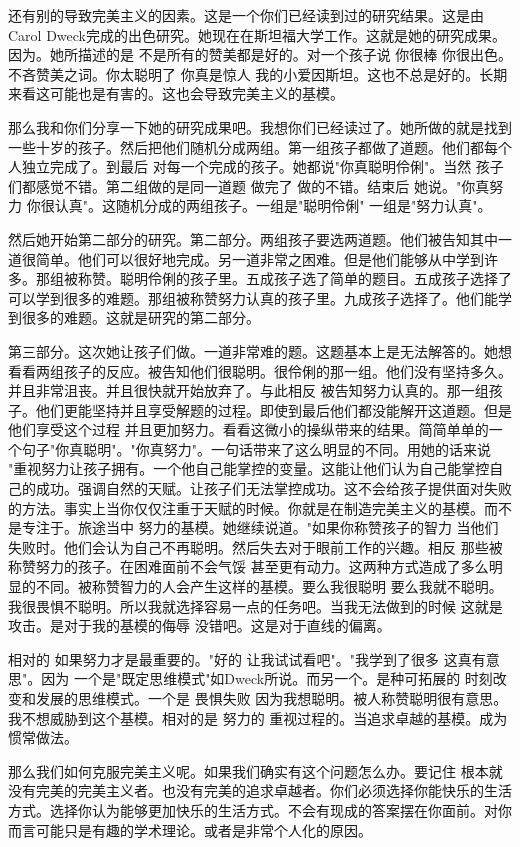 还有别的导致完美主义的因素。这是一个你们已经读到过的研究结果。这是由Carol Dweck完成的出色研究。她现在在斯坦福大学工作。这就是她的研究成果。因为。她所描述的是 不是所有的赞美都是好的。对一个孩子说 你很棒 你很出色。不吝赞美之词。你太聪明了 你真是惊人 我的小爱因斯坦。这也不总是好的。长期来看这可能也是有害的。这也会导致完美主义的基模。 

那么我和你们分享一下她的研究成果吧。我想你们已经读过了。她所做的就是找到一些十岁的孩子。然后把他们随机分成两组。第一组孩子都做了道题。他们都每个人独立完成了。到最后 对每一个完成的孩子。她都说"你真聪明伶俐"。当然 孩子们都感觉不错。第二组做的是同一道题 做完了 做的不错。结束后 她说。"你真努力 你很认真"。这随机分成的两组孩子。一组是"聪明伶俐" 一组是"努力认真"。 

然后她开始第二部分的研究。第二部分。两组孩子要选两道题。他们被告知其中一道很简单。他们可以很好地完成。另一道非常之困难。但是他们能够从中学到许多。那组被称赞。聪明伶俐的孩子里。五成孩子选了简单的题目。五成孩子选择了可以学到很多的难题。那组被称赞努力认真的孩子里。九成孩子选择了。他们能学到很多的难题。这就是研究的第二部分。 

第三部分。这次她让孩子们做。一道非常难的题。这题基本上是无法解答的。她想看看两组孩子的反应。被告知他们很聪明。很伶俐的那一组。他们没有坚持多久。并且非常沮丧。并且很快就开始放弃了。与此相反 被告知努力认真的。那一组孩子。他们更能坚持并且享受解题的过程。即使到最后他们都没能解开这道题。但是他们享受这个过程 并且更加努力。看看这微小的操纵带来的结果。简简单单的一个句子"你真聪明"。"你真努力"。一句话带来了这么明显的不同。用她的话来说 "重视努力让孩子拥有。一个他自己能掌控的变量。这能让他们认为自己能掌控自己的成功。强调自然的天赋。让孩子们无法掌控成功。这不会给孩子提供面对失败的方法。事实上当你仅仅注重于天赋的时候。你就是在制造完美主义的基模。而不是专注于。旅途当中 努力的基模。她继续说道。"如果你称赞孩子的智力 当他们失败时。他们会认为自己不再聪明。然后失去对于眼前工作的兴趣。相反 那些被称赞努力的孩子。在困难面前不会气馁 甚至更有动力。这两种方式造成了多么明显的不同。被称赞智力的人会产生这样的基模。要么我很聪明 要么我就不聪明。我很畏惧不聪明。所以我就选择容易一点的任务吧。当我无法做到的时候 这就是攻击。是对于我的基模的侮辱 没错吧。这是对于直线的偏离。 

相对的 如果努力才是最重要的。"好的 让我试试看吧"。"我学到了很多 这真有意思"。因为 一个是"既定思维模式"如Dweck所说。而另一个。是种可拓展的 时刻改变和发展的思维模式。一个是 畏惧失败 因为我想聪明。被人称赞聪明很有意思。我不想威胁到这个基模。相对的是 努力的 重视过程的。当追求卓越的基模。成为惯常做法。 

那么我们如何克服完美主义呢。如果我们确实有这个问题怎么办。要记住 根本就没有完美的完美主义者。也没有完美的追求卓越者。你们必须选择你能快乐的生活方式。选择你认为能够更加快乐的生活方式。不会有现成的答案摆在你面前。对你而言可能只是有趣的学术理论。或者是非常个人化的原因。 

